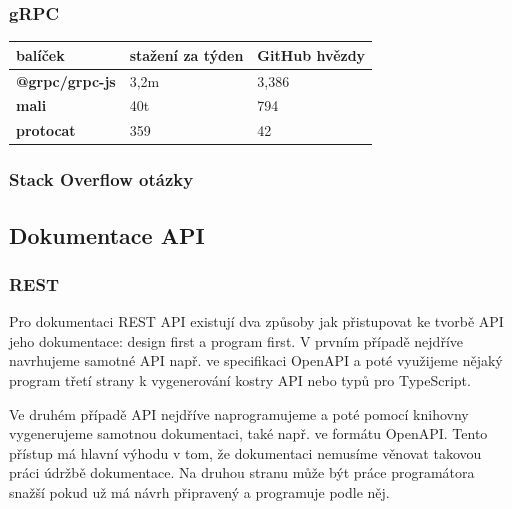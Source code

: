 \documentclass[thesis=M,czech]{FITthesis}[2019/12/23]
\begin{document}
\subsubsection*{gRPC}
\begin{table}[H]
  \begin{tabular}{|l|l|l|}
  \hline
  \textbf{balíček}                                 & \textbf{stažení za týden}                           & \textbf{GitHub hvězdy} \\ \hline
  \textbf{@grpc/grpc-js}                           & 3,2m                                                & 3,386                  \\ \hline
  \textbf{mali}                                    & 40t                                                 & 794                    \\ \hline
  \textbf{protocat}                                & 359                                                 & 42                     \\ \hline
  \end{tabular}
\end{table}
\subsubsection*{Stack Overflow otázky}

\subsection*{Dokumentace API}
\subsubsection*{REST}
Pro dokumentaci REST API existují dva způsoby jak přistupovat ke tvorbě API jeho dokumentace: design first a program first.%
V prvním případě nejdříve navrhujeme samotné API např. ve specifikaci OpenAPI a poté využijeme nějaký program třetí strany k vygenerování kostry API nebo typů pro TypeScript.

Ve druhém případě API nejdříve naprogramujeme a poté pomocí knihovny vygenerujeme samotnou dokumentaci, také např. ve formátu OpenAPI. Tento přístup má hlavní výhodu v tom, že dokumentaci nemusíme věnovat takovou práci údržbě dokumentace. Na druhou stranu může být práce programátora snažší pokud už má návrh připravený a programuje podle něj.
\end{document}
